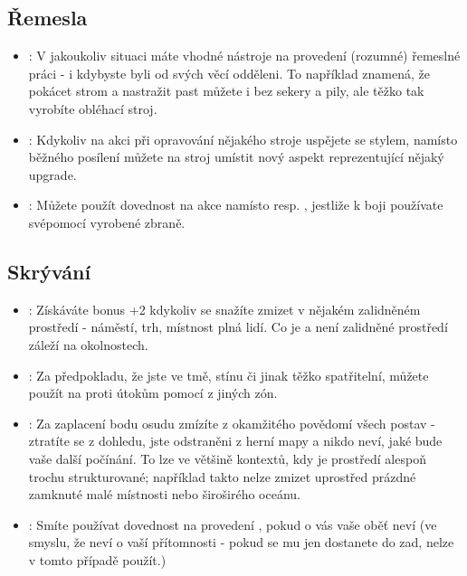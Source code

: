 \subsection{Řemesla}
\label{sec:trik-remesla}
\begin{itemize}
  
\item{}:
\label{sec:remesla-pripraven}
V jakoukoliv situaci máte vhodné nástroje na provedení (rozumné) řemeslné práci - i kdybyste byli od svých věcí odděleni. To například znamená, že pokácet strom a nastražit past můžete i bez sekery a pily, ale těžko tak vyrobíte obléhací stroj.

\item{}:
\label{sec:remesla-lepsi}
Kdykoliv na akci  při opravování nějakého stroje uspějete se stylem, namísto běžného posílení můžete na stroj umístit nový aspekt reprezentující nějaký upgrade.

\item {}:
\label{sec:remesla-zbrane}
 Můžete použít dovednost  na akce  namísto  resp. , jestliže k boji používate svépomocí vyrobené zbraně.

\end{itemize}



\subsection{Skrývání}
\label{sec:trik-skryvani}
\begin{itemize}
  
\item{}:
\label{sec:skryvani-tvar}
Získáváte bonus +2 kdykoliv se snažíte zmizet v nějakém zalidněném prostředí - náměstí, trh, místnost plná lidí. Co je a není zalidněné prostředí záleží na okolnostech.

\item{}:
\label{sec:skryvani-nejasny}
Za předpokladu, že jste ve tmě, stínu či jinak těžko spatřitelní, můžete použít  na  proti útokům pomocí  z jiných zón.

\item{}:
\label{sec:skryvani-zmizel}
  Za zaplacení bodu osudu zmízíte z okamžitého povědomí všech postav - ztratíte se z dohledu, jste odstraněni z herní mapy a nikdo neví, jaké bude vaše další počínání. To lze ve většině kontextů, kdy je prostředí alespoň trochu strukturované; například takto nelze zmizet uprostřed prázdné zamknuté malé místnosti nebo široširého oceánu.

\item{}:
\label{sec:skryvani-utok}
 Smíte používat dovednost  na provedení , pokud o vás vaše oběť neví (ve smyslu, že neví o vaší přítomnosti - pokud se mu jen dostanete do zad, nelze v tomto případě  použít.)
\end{itemize}

